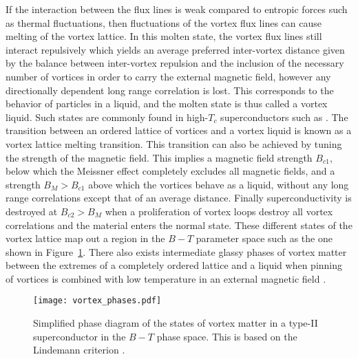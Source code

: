 If the interaction between the flux lines is weak compared to entropic forces such as thermal fluctuations, then fluctuations of the vortex flux lines can cause melting of the vortex lattice.
In this molten state, the vortex flux lines still interact repulsively which yields an average preferred inter-vortex distance given by the balance between inter-vortex repulsion and the inclusion of the
necessary number of vortices in order to carry the external magnetic field, however any directionally dependent long range correlation is lost. This corresponds to the behavior
of particles in a liquid, and the molten state is thus called a vortex liquid. Such states are commonly found in high-$T_c$ superconductors such as .
The transition between an ordered lattice of vortices and a vortex liquid is known as a vortex lattice melting transition.
This transition can also be achieved by tuning the strength of the magnetic field. This implies a magnetic field strength $B_{c1}$, below which the Meissner effect
completely excludes all magnetic fields, and a strength $B_{M}>B_{c1}$ above which the vortices behave as a liquid, \ie without any long range correlations except that of an average distance.
Finally superconductivity is destroyed at $B_{c2}>B_M$ when a proliferation of vortex loops destroy all vortex correlations and the material enters the normal state.
These different states of the vortex lattice map out a region in the $B-T$ parameter space such as the one shown in Figure~\ref{fig:Vor:phases}.
There also exists intermediate glassy phases of vortex matter between the extremes of a completely ordered lattice and a liquid when pinning of vortices is combined
with low temperature in an external magnetic field \cite{Sanchez19,Koch89}.

\begin{figure}[t]
    \centering
    \texttt{[image: vortex\_phases.pdf]}
    \caption{Simplified phase diagram of the states of vortex matter in a type-II superconductor in the $B-T$ phase space. This is based on the Lindemann criterion \cite{Sonier98}.}
    \label{fig:Vor:phases}
\end{figure}

